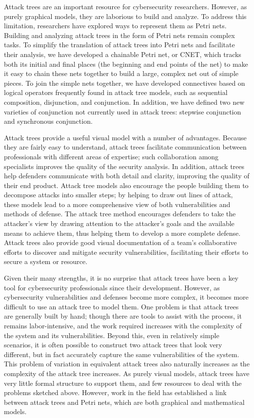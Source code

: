\par  Attack trees are an important resource for cybersecurity researchers. However, as purely graphical models, they are laborious to build and analyze. To address this limitation, researchers have explored ways to represent them as Petri nets. Building and analyzing attack trees in the form of Petri nets remain complex tasks. To simplify the translation of attack trees into Petri nets and facilitate their analysis, we have developed a chainable Petri net, or CNET, which tracks both its initial and final places (the beginning and end points of the net) to make it easy to chain these nets together to build a large, complex net out of simple pieces. To join the simple nets together, we have developed connectives based on logical operators frequently found in attack tree models, such as sequential composition, disjunction, and conjunction. In addition, we have defined two new varieties of conjunction not currently used in attack trees: stepwise conjunction and synchronous conjunction. 
\par Attack trees provide a useful visual model with a number of advantages. Because they are fairly easy to understand, attack trees facilitate communication between professionals with different areas of expertise; such collaboration among specialists improves the quality of the security analysis. In addition, attack trees help defenders communicate with both detail and clarity, improving the quality of their end product. Attack tree models also encourage the people building them to decompose attacks into smaller steps; by helping to draw out lines of attack, these models lead to a more comprehensive view of both vulnerabilities and methods of defense. The attack tree method encourages defenders to take the attacker's view by drawing attention to the attacker's goals and the available means to achieve them, thus helping them to develop a more complete defense. Attack trees also provide good visual documentation of a team's collaborative efforts to discover and mitigate security vulnerabilities, facilitating their efforts to secure a system or resource. 
\par Given their many strengths, it is no surprise that attack trees have been a key tool for cybersecurity professionals since their development. However, as cybersecurity vulnerabilities and defenses become more complex, it becomes more difficult to use an attack tree to model them. One problem is that attack trees are generally built by hand; though there are tools to assist with the process, it remains labor-intensive, and the work required increases with the complexity of the system and its vulnerabilities. Beyond this, even in relatively simple scenarios, it is often possible to construct two attack trees that look very different, but in fact accurately capture the same vulnerabilities of the system. This problem of variation in equivalent attack trees also naturally increases as the complexity of the attack tree increases. As purely visual models, attack trees have very little formal structure to support them, and few resources to deal with the problems sketched above. However, work in the field has established a link between attack trees and Petri nets, which are both graphical and mathematical models.
